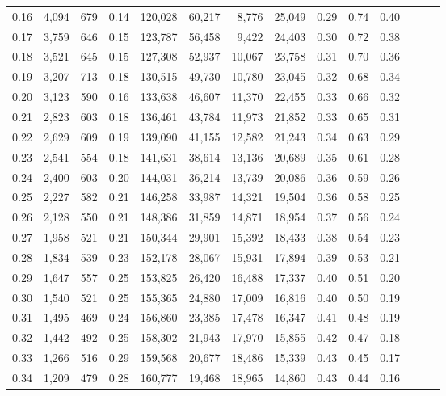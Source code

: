 \begin{tabular}{rrrrrrrrrrrrrr}
0.16 &   4,094 &  679 &  0.14 &  120,028 &   60,217 &   8,776 &  25,049 &  0.29 &  0.74 &      0.40 \\
0.17 &   3,759 &  646 &  0.15 &  123,787 &   56,458 &   9,422 &  24,403 &  0.30 &  0.72 &      0.38 \\
0.18 &   3,521 &  645 &  0.15 &  127,308 &   52,937 &  10,067 &  23,758 &  0.31 &  0.70 &      0.36 \\
0.19 &   3,207 &  713 &  0.18 &  130,515 &   49,730 &  10,780 &  23,045 &  0.32 &  0.68 &      0.34 \\
0.20 &   3,123 &  590 &  0.16 &  133,638 &   46,607 &  11,370 &  22,455 &  0.33 &  0.66 &      0.32 \\
0.21 &   2,823 &  603 &  0.18 &  136,461 &   43,784 &  11,973 &  21,852 &  0.33 &  0.65 &      0.31 \\
0.22 &   2,629 &  609 &  0.19 &  139,090 &   41,155 &  12,582 &  21,243 &  0.34 &  0.63 &      0.29 \\
0.23 &   2,541 &  554 &  0.18 &  141,631 &   38,614 &  13,136 &  20,689 &  0.35 &  0.61 &      0.28 \\
0.24 &   2,400 &  603 &  0.20 &  144,031 &   36,214 &  13,739 &  20,086 &  0.36 &  0.59 &      0.26 \\
0.25 &   2,227 &  582 &  0.21 &  146,258 &   33,987 &  14,321 &  19,504 &  0.36 &  0.58 &      0.25 \\
0.26 &   2,128 &  550 &  0.21 &  148,386 &   31,859 &  14,871 &  18,954 &  0.37 &  0.56 &      0.24 \\
0.27 &   1,958 &  521 &  0.21 &  150,344 &   29,901 &  15,392 &  18,433 &  0.38 &  0.54 &      0.23 \\
0.28 &   1,834 &  539 &  0.23 &  152,178 &   28,067 &  15,931 &  17,894 &  0.39 &  0.53 &      0.21 \\
0.29 &   1,647 &  557 &  0.25 &  153,825 &   26,420 &  16,488 &  17,337 &  0.40 &  0.51 &      0.20 \\
0.30 &   1,540 &  521 &  0.25 &  155,365 &   24,880 &  17,009 &  16,816 &  0.40 &  0.50 &      0.19 \\
0.31 &   1,495 &  469 &  0.24 &  156,860 &   23,385 &  17,478 &  16,347 &  0.41 &  0.48 &      0.19 \\
0.32 &   1,442 &  492 &  0.25 &  158,302 &   21,943 &  17,970 &  15,855 &  0.42 &  0.47 &      0.18 \\
0.33 &   1,266 &  516 &  0.29 &  159,568 &   20,677 &  18,486 &  15,339 &  0.43 &  0.45 &      0.17 \\
0.34 &   1,209 &  479 &  0.28 &  160,777 &   19,468 &  18,965 &  14,860 &  0.43 &  0.44 &      0.16 \\

\end{tabular}
